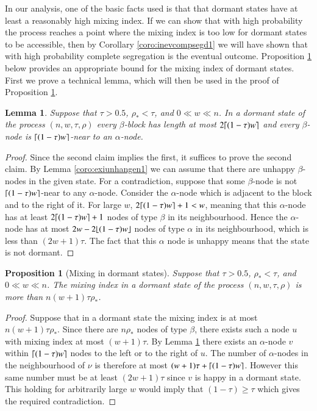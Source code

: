 \documentclass[11pt]{article}
\theoremstyle{plain}
\newtheorem{prop}[thm]{Proposition}
\newtheorem{lem}[thm]{Lemma}
\numberwithin{equation}{subsection}
\DeclarePairedDelimiter{\floor}{\lfloor}{\rfloor}
\begin{document}
In our analysis, one of the basic facts used is that that dormant states have at least a reasonably high mixing index. If we can show that with high probability the process reaches a point where the mixing index is too low for dormant states to be accessible, then by Corollary \ref{coro:inevcompsegd1} we will have shown that with high probability complete segregation is the eventual outcome. Proposition \ref{prop:maxmixindor} below provides an appropriate bound for the mixing index of dormant states. First we prove a technical lemma, which will then be used in the proof of Proposition \ref{prop:maxmixindor}. 



\begin{lem}\label{le:blockdorml}
Suppose that  $\tau>0.5$, $\rho_{\ast}<\tau$, and $0\ll w \ll n$. In a dormant state of the process $(n, w, \tau, \rho)$ 
every $\beta$-block has length at most
$2\lceil(1-\tau)w\rceil$ and every $\beta$-node is
$\lceil(1-\tau)w\rceil$-near to an $\alpha$-node.
\end{lem}
\begin{proof}
Since the second claim implies the first, it suffices to prove the second claim. By Lemma \ref{coro:exiunhangen1} we can assume that there are unhappy $\beta$-nodes
in the given state. 
For a contradiction, suppose that
some $\beta$-node is not
$\lceil(1-\tau)w\rceil$-near to any $\alpha$-node.
Consider the $\alpha$-node
which is adjacent to the block and to the right of it.
For large $w$,  $2\lceil(1-\tau)w\rceil+1 < w$, 
meaning that this  $\alpha$-node has at least  
$2\lceil(1-\tau)w\rceil+1$ nodes of type $\beta$
in its neighbourhood. 
Hence the $\alpha$-node has at most 
$2w-2\floor{(1-\tau)w}$ nodes of type $\alpha$ in its neighbourhood, 
which is less than  $(2w+1)\tau$.  The fact that this  $\alpha$ node is unhappy means that the state is not dormant.  
\end{proof}

\begin{prop}[Mixing in dormant states]\label{prop:maxmixindor}
Suppose that  $\tau>0.5$, $\rho_{\ast}<\tau$, and $0\ll w \ll n$. 
The mixing index in a dormant state of the process $(n, w, \tau, \rho)$ is more than $n(w+1)\tau\rho_{\ast}$. 
\end{prop}
\begin{proof}
Suppose that in a dormant state the mixing index is at most
$n(w+1)\tau\rho_{\ast}$.
Since there are $n\rho_{\ast}$ nodes of type $\beta$,  
there exists such a node $u$
with mixing index at most
$(w+1)\tau$. By Lemma \ref{le:blockdorml}
there exists an $\alpha$-node $v$ within $\lceil(1-\tau)w\rceil$ nodes 
to the left or to the right
of $u$. The number of $\alpha$-nodes in the 
neighbourhood of $\nu$ is therefore at most 
$(w+1)\tau +\lceil(1-\tau)w\rceil$. However this same number 
must be at least $(2w+1)\tau$ since 
$v$ is happy in a dormant state. This holding for arbitrarily  large $w$ would imply that $(1-\tau)\geq \tau$ which gives the required contradiction. 
 \end{proof}
 
\end{document}
